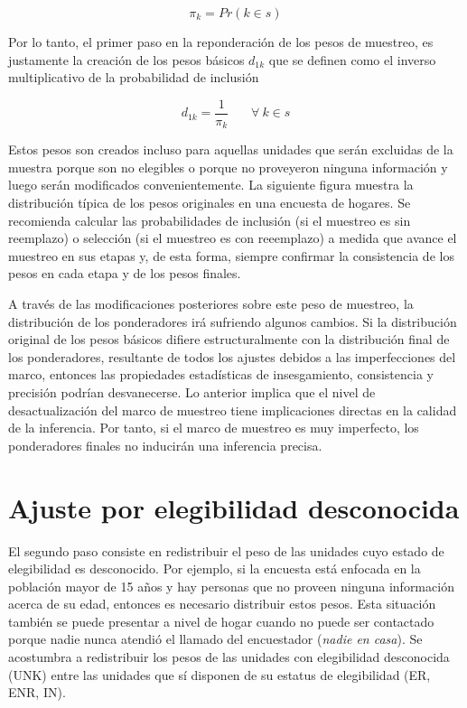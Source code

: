 \documentclass[
  12pt,
  spanish,
]{book}
\begin{document}
\[\pi_k = Pr (k \in s)\]

Por lo tanto, el primer paso en la reponderación de los pesos de muestreo, es justamente la creación de los pesos básicos \(d_{1k}\) que se definen como el inverso multiplicativo de la probabilidad de inclusión

\[d_{1k} = \frac{1}{\pi_k}  \ \ \ \ \ \ \ \ \forall \ k\in s\]

Estos pesos son creados incluso para aquellas unidades que serán excluidas de la muestra porque son no elegibles o porque no proveyeron ninguna información y luego serán modificados convenientemente. La siguiente figura muestra la distribución típica de los pesos originales en una encuesta de hogares. Se recomienda calcular las probabilidades de inclusión (si el muestreo es sin reemplazo) o selección (si el muestreo es con reeemplazo) a medida que avance el muestreo en sus etapas y, de esta forma, siempre confirmar la consistencia de los pesos en cada etapa y de los pesos finales.

A través de las modificaciones posteriores sobre este peso de muestreo, la distribución de los ponderadores irá sufriendo algunos cambios. Si la distribución original de los pesos básicos difiere estructuralmente con la distribución final de los ponderadores, resultante de todos los ajustes debidos a las imperfecciones del marco, entonces las propiedades estadísticas de insesgamiento, consistencia y precisión podrían desvanecerse. Lo anterior implica que el nivel de desactualización del marco de muestreo tiene implicaciones directas en la calidad de la inferencia. Por tanto, si el marco de muestreo es muy imperfecto, los ponderadores finales no inducirán una inferencia precisa.

\hypertarget{ajuste-por-elegibilidad-desconocida}{%
\section{Ajuste por elegibilidad desconocida}\label{ajuste-por-elegibilidad-desconocida}}

El segundo paso consiste en redistribuir el peso de las unidades cuyo estado de elegibilidad es desconocido. Por ejemplo, si la encuesta está enfocada en la población mayor de 15 años y hay personas que no proveen ninguna información acerca de su edad, entonces es necesario distribuir estos pesos. Esta situación también se puede presentar a nivel de hogar cuando no puede ser contactado porque nadie nunca atendió el llamado del encuestador (\emph{nadie en casa}). Se acostumbra a redistribuir los pesos de las unidades con elegibilidad desconocida (UNK) entre las unidades que sí disponen de su estatus de elegibilidad (ER, ENR, IN).
\end{document}
